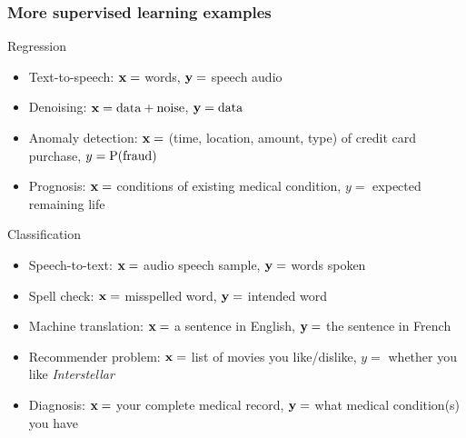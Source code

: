 \begin{frame}
    \frametitle{More supervised learning examples}

    Regression
    \begin{itemize}
        \item Text-to-speech: $\mathbf{x} =$ words, $\mathbf{y} =$ speech audio
        \item Denoising: $\mathbf{x} = \text{data} + \text{noise}$, $\mathbf{y} = \text{data}$
        \item Anomaly detection: $\mathbf{x} =$ (time, location, amount, type) of credit card purchase, $y = \operatorname{\mathrm{P}}(\text{fraud})$
        \item Prognosis: $\mathbf{x} =$ conditions of existing medical condition, $y =$ expected remaining life
    \end{itemize}
    \pause

    Classification
    \begin{itemize}
        \item Speech-to-text: $\mathbf{x} =$ audio speech sample, $\mathbf{y} =$ words spoken
        \item Spell check: $\mathbf{x} =$ misspelled word, $\mathbf{y} =$ intended word
        \item Machine translation: $\mathbf{x} =$ a sentence in English, $\mathbf{y} =$ the sentence in French
        \item Recommender problem: $\mathbf{x} =$ list of movies you like/dislike, $y =$ whether you like \emph{Interstellar}
        \item Diagnosis: $\mathbf{x} =$ your complete medical record, $\mathbf{y} =$ what medical condition(s) you have
    \end{itemize}
\end{frame}

